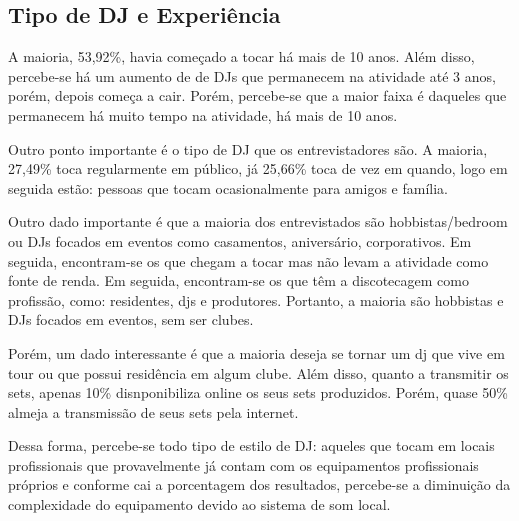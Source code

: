 \subsection{Tipo de DJ e Experiência}
A maioria, 53,92\%, havia começado a tocar há mais de 10 anos. Além disso, percebe-se há um aumento de de DJs que permanecem na atividade até 3 anos, porém, depois começa a cair. Porém, percebe-se que a maior faixa é daqueles que permanecem há muito tempo na atividade, há mais de 10 anos.
\par
Outro ponto importante é o tipo de DJ que os entrevistadores são. A maioria, 27,49\% toca regularmente em público, já 25,66\% toca de vez em quando, logo em seguida estão: pessoas que tocam ocasionalmente para amigos e família.
\par
Outro dado importante é que a maioria dos entrevistados são hobbistas/bedroom ou DJs focados em eventos como casamentos, aniversário, corporativos. Em seguida, encontram-se os que chegam a tocar mas não levam a atividade como fonte de renda. Em seguida, encontram-se os que têm a discotecagem como profissão, como: residentes, djs e produtores. Portanto, a maioria são hobbistas e DJs focados em eventos, sem ser clubes.
\par
Porém, um dado interessante é que a maioria deseja se tornar um dj que vive em tour ou que possui residência em algum clube. Além disso, quanto a transmitir os sets, apenas 10\% disnponibiliza online os seus sets produzidos. Porém, quase 50\% almeja a transmissão de seus sets pela internet.
\par
Dessa forma, percebe-se todo tipo de estilo de DJ: aqueles que tocam em locais profissionais que provavelmente já contam com os equipamentos profissionais próprios e conforme cai a porcentagem dos resultados, percebe-se a diminuição da complexidade do equipamento devido ao sistema de som local.

